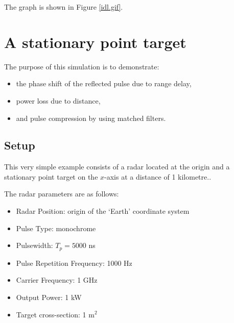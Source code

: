 The graph is shown in Figure \ref{idl.gif}.


\section{\protect\smallskip A stationary point target}

The purpose of this simulation is to demonstrate:

\begin{itemize}
\item  the phase shift of the reflected pulse due to range delay,

\item  power loss due to distance,

\item  and pulse compression by using matched filters.
\end{itemize}

\subsection{Setup}

\smallskip This very simple example consists of a radar located at the
origin and a stationary point target on the $x$-axis at a distance of 1
kilometre..

\smallskip The radar parameters are as follows:

\begin{itemize}
\item  \smallskip Radar Position: origin of the `Earth' coordinate system

\item  \smallskip Pulse Type: monochrome

\item  \smallskip Pulsewidth: $T_{p}=5000$ ns

\item  \smallskip Pulse Repetition Frequency: 1000 Hz

\item  \smallskip Carrier Frequency: 1 GHz

\item  \smallskip Output Power: 1 kW

\item  Target cross-section: 1 m$^{2}$
\end{itemize}

